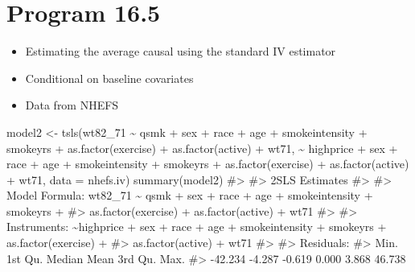 \documentclass[
  10pt,
  a4paper,
]{book}
\newenvironment{Shaded}{\begin{snugshade}}{\end{snugshade}}
\newcommand{\AttributeTok}[1]{\textcolor[rgb]{0.40,0.45,0.13}{#1}}
\newcommand{\CommentTok}[1]{\textcolor[rgb]{0.37,0.37,0.37}{#1}}
\newcommand{\FunctionTok}[1]{\textcolor[rgb]{0.28,0.35,0.67}{#1}}
\newcommand{\NormalTok}[1]{\textcolor[rgb]{0.00,0.46,0.62}{#1}}
\newcommand{\OtherTok}[1]{\textcolor[rgb]{0.00,0.46,0.62}{#1}}
\newcommand{\SpecialCharTok}[1]{\textcolor[rgb]{0.37,0.37,0.37}{#1}}
\providecommand{\tightlist}{%
  \setlength{\itemsep}{0pt}\setlength{\parskip}{0pt}}
\begin{document}
\section{Program 16.5}\label{program-16.5}

\begin{itemize}
\tightlist
\item
  Estimating the average causal using the standard IV estimator
\item
  Conditional on baseline covariates
\item
  Data from NHEFS
\end{itemize}

\begin{Shaded}
\begin{Highlighting}[]
\NormalTok{model2 }\OtherTok{\textless{}{-}} \FunctionTok{tsls}\NormalTok{(wt82\_71 }\SpecialCharTok{\textasciitilde{}}\NormalTok{ qsmk }\SpecialCharTok{+}\NormalTok{ sex }\SpecialCharTok{+}\NormalTok{ race }\SpecialCharTok{+}\NormalTok{ age }\SpecialCharTok{+}\NormalTok{ smokeintensity }\SpecialCharTok{+}\NormalTok{ smokeyrs }\SpecialCharTok{+}
                      \FunctionTok{as.factor}\NormalTok{(exercise) }\SpecialCharTok{+} \FunctionTok{as.factor}\NormalTok{(active) }\SpecialCharTok{+}\NormalTok{ wt71,}
             \SpecialCharTok{\textasciitilde{}}\NormalTok{ highprice }\SpecialCharTok{+}\NormalTok{ sex }\SpecialCharTok{+}\NormalTok{ race }\SpecialCharTok{+}\NormalTok{ age }\SpecialCharTok{+}\NormalTok{ smokeintensity }\SpecialCharTok{+}\NormalTok{ smokeyrs }\SpecialCharTok{+} \FunctionTok{as.factor}\NormalTok{(exercise) }\SpecialCharTok{+}
               \FunctionTok{as.factor}\NormalTok{(active) }\SpecialCharTok{+}\NormalTok{ wt71, }\AttributeTok{data =}\NormalTok{ nhefs.iv)}
\FunctionTok{summary}\NormalTok{(model2)}
\CommentTok{\#\textgreater{} }
\CommentTok{\#\textgreater{}  2SLS Estimates}
\CommentTok{\#\textgreater{} }
\CommentTok{\#\textgreater{} Model Formula: wt82\_71 \textasciitilde{} qsmk + sex + race + age + smokeintensity + smokeyrs + }
\CommentTok{\#\textgreater{}     as.factor(exercise) + as.factor(active) + wt71}
\CommentTok{\#\textgreater{} }
\CommentTok{\#\textgreater{} Instruments: \textasciitilde{}highprice + sex + race + age + smokeintensity + smokeyrs + as.factor(exercise) + }
\CommentTok{\#\textgreater{}     as.factor(active) + wt71}
\CommentTok{\#\textgreater{} }
\CommentTok{\#\textgreater{} Residuals:}
\CommentTok{\#\textgreater{}    Min. 1st Qu.  Median    Mean 3rd Qu.    Max. }
\CommentTok{\#\textgreater{} {-}42.234  {-}4.287  {-}0.619   0.000   3.868  46.738 }

\end{Highlighting}
\end{Shaded}
\end{document}
